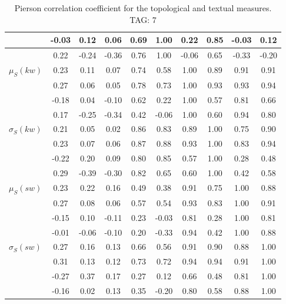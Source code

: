 \begin{table*}[h!]
\begin{center}
\begin{tabular}{| l | c | c | c | c | c | c | c | c | c |}
 & -0.03  & 0.12  & 0.06  & 0.69  & 1.00  & 0.22  & 0.85  & -0.03  & 0.12 \\\hline
 & 0.22  & -0.24  & -0.36  & 0.76  & 1.00  & -0.06  & 0.65  & -0.33  & -0.20 \\\hline
$\mu_S(kw)$ & 0.23  & 0.11  & 0.07  & 0.74  & 0.58  & 1.00  & 0.89  & 0.91  & 0.91 \\\hline
 & 0.27  & 0.06  & 0.05  & 0.78  & 0.73  & 1.00  & 0.93  & 0.93  & 0.94 \\\hline
 & -0.18  & 0.04  & -0.10  & 0.62  & 0.22  & 1.00  & 0.57  & 0.81  & 0.66 \\\hline
 & 0.17  & -0.25  & -0.34  & 0.42  & -0.06  & 1.00  & 0.60  & 0.94  & 0.80 \\\hline
$\sigma_S(kw)$ & 0.21  & 0.05  & 0.02  & 0.86  & 0.83  & 0.89  & 1.00  & 0.75  & 0.90 \\\hline
 & 0.23  & 0.07  & 0.06  & 0.87  & 0.88  & 0.93  & 1.00  & 0.83  & 0.94 \\\hline
 & -0.22  & 0.20  & 0.09  & 0.80  & 0.85  & 0.57  & 1.00  & 0.28  & 0.48 \\\hline
 & 0.29  & -0.39  & -0.30  & 0.82  & 0.65  & 0.60  & 1.00  & 0.42  & 0.58 \\\hline
$\mu_S(sw)$ & 0.23  & 0.22  & 0.16  & 0.49  & 0.38  & 0.91  & 0.75  & 1.00  & 0.88 \\\hline
 & 0.27  & 0.08  & 0.06  & 0.57  & 0.54  & 0.93  & 0.83  & 1.00  & 0.91 \\\hline
 & -0.15  & 0.10  & -0.11  & 0.23  & -0.03  & 0.81  & 0.28  & 1.00  & 0.81 \\\hline
 & -0.01  & -0.06  & -0.10  & 0.20  & -0.33  & 0.94  & 0.42  & 1.00  & 0.88 \\\hline
$\sigma_S(sw)$ & 0.27  & 0.16  & 0.13  & 0.66  & 0.56  & 0.91  & 0.90  & 0.88  & 1.00 \\\hline
 & 0.31  & 0.13  & 0.12  & 0.73  & 0.72  & 0.94  & 0.94  & 0.91  & 1.00 \\\hline
 & -0.27  & 0.37  & 0.17  & 0.27  & 0.12  & 0.66  & 0.48  & 0.81  & 1.00 \\\hline
 & -0.16  & 0.02  & 0.13  & 0.35  & -0.20  & 0.80  & 0.58  & 0.88  & 1.00 \\\hline
\end{tabular}
\caption{Pierson correlation coefficient for the topological and textual measures. TAG: 7}
\end{center}
\end{table*}